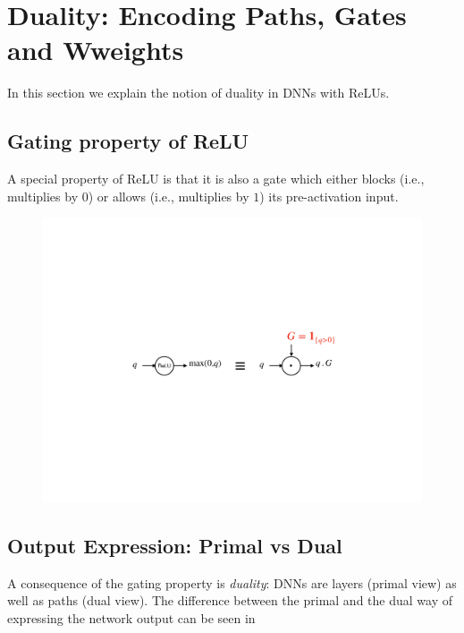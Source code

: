 \section{Duality: Encoding Paths, Gates and Wweights}
In this section we explain the notion of duality in DNNs with ReLUs. 
\subsection{Gating property of ReLU}
A special property of ReLU is that it is also a gate which either blocks (i.e., multiplies by $0$) or allows (i.e., multiplies by $1$) its pre-activation input. 
\FloatBarrier
\begin{figure}[H]
\includegraphics[scale=0.4]{figs/gating.pdf}
\end{figure}
\subsection{Output Expression: Primal vs Dual}
A consequence of the gating property is \emph{duality}: DNNs are layers (primal view) as well as paths (dual view). The difference between the primal and the dual way of expressing the network output can be seen in 
\FloatBarrier
\begin{table}[H]
\caption{$\Theta(l),l=1,\ldots,d$ is the weight of layer $l$.}
\label{tb:primal-dual}
\end{table}
